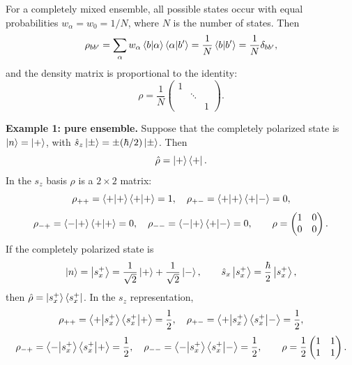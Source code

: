 For a completely mixed ensemble, all possible states occur with equal probabilities $w_\alpha=w_0=1/N$, where $N$ is the number of states. Then
\begin{equation}
\rho_{bb'}=\sum_\alpha w_\alpha\left\langle b\middle|\alpha\right\rangle\left\langle\alpha\middle|b'\right\rangle
=\frac1N\left\langle b\middle|b'\right\rangle=\frac1N\delta_{bb'},
\end{equation}
and the density matrix is proportional to the identity:
\begin{equation}
\rho=\frac1N\begin{pmatrix}1&&\\&\ddots&\\&&1\end{pmatrix}.
\end{equation}

\textbf{Example 1: pure ensemble.} Suppose that the completely polarized state is $\left|n\right\rangle=\left|+\right\rangle$, with $\hat{s}_z\left|\pm\right\rangle=\pm(\hbar/2)\left|\pm\right\rangle$. Then
\begin{equation}
\hat{\rho}=\left|+\right\rangle\left\langle+\right|.
\end{equation}
In the $s_z$ basis $\rho$ is a $2\times2$ matrix:
\begin{equation}
\rho_{++}=\left\langle+\middle|+\right\rangle\left\langle+\middle|+\right\rangle=1,\quad
\rho_{+-}=\left\langle+\middle|+\right\rangle\left\langle+\middle|-\right\rangle=0,
\end{equation}
\begin{equation}
\rho_{-+}=\left\langle-\middle|+\right\rangle\left\langle+\middle|+\right\rangle=0,\quad
\rho_{--}=\left\langle-\middle|+\right\rangle\left\langle+\middle|-\right\rangle=0,\qquad
\rho=\begin{pmatrix}1&0\\0&0\end{pmatrix}.
\end{equation}
If the completely polarized state is
\begin{equation}
\left|n\right\rangle=\left|s_x^+\right\rangle=\frac1{\sqrt2}\left|+\right\rangle+\frac1{\sqrt2}\left|-\right\rangle,\qquad
\hat{s}_x\left|s_x^+\right\rangle=\frac\hbar2\left|s_x^+\right\rangle,
\end{equation}
then $\hat{\rho}=\left|s_x^+\right\rangle\left\langle s_x^+\right|$. In the $s_z$ representation,
\begin{equation}
\rho_{++}=\left\langle+\middle|s_x^+\right\rangle\left\langle s_x^+\middle|+\right\rangle=\frac12,\quad
\rho_{+-}=\left\langle+\middle|s_x^+\right\rangle\left\langle s_x^+\middle|-\right\rangle=\frac12,
\end{equation}
\begin{equation}
\rho_{-+}=\left\langle-\middle|s_x^+\right\rangle\left\langle s_x^+\middle|+\right\rangle=\frac12,\quad
\rho_{--}=\left\langle-\middle|s_x^+\right\rangle\left\langle s_x^+\middle|-\right\rangle=\frac12,\qquad
\rho=\frac12\begin{pmatrix}1&1\\1&1\end{pmatrix}.
\end{equation}

